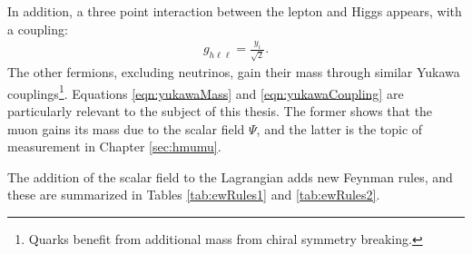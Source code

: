 In addition, a three point interaction between the lepton and Higgs appears, with a coupling:
\begin{equation}\begin{split}\label{eqn:yukawaCoupling}
    g_{h\ell\ell}=\frac{y_i}{\sqrt{2}}.
\end{split}\end{equation}
The other fermions, excluding neutrinos, gain their mass through similar Yukawa couplings\footnote{Quarks benefit from additional mass from chiral symmetry breaking.}.
Equations \ref{eqn:yukawaMass} and \ref{eqn:yukawaCoupling} are particularly relevant to the subject of this thesis.
The former shows that the muon gains its mass due to the scalar field $\Psi$, and the latter is the topic of measurement in Chapter \ref{sec:hmumu}.

The addition of the scalar field to the Lagrangian adds new Feynman rules, and these are summarized in Tables \ref{tab:ewRules1} and \ref{tab:ewRules2}.


